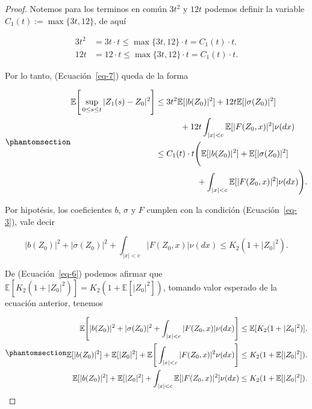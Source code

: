 \documentclass[
  spanish,
  us-letterpaper,
]{scrreprt}
\theoremstyle{plain}
\theoremstyle{plain}
\theoremstyle{definition}
\theoremstyle{plain}
\theoremstyle{remark}
\begin{document}
\begin{proof}
Notemos para los terminos en común \(3t^2\) y \(12t\) podemos definir la
variable \(C_1(t):=\max{\{3t,12\}}\), de aquí

\[
    \begin{aligned}
        3t^2 & = 3t\cdot t \leq \max{\{3t,12\}}\cdot t = C_1(t)\cdot t.\\ 
        12t & = 12\cdot t \leq \max{\{3t,12\}}\cdot t = C_1(t)\cdot t.
    \end{aligned}
\]

Por lo tanto, (Ecuación~\ref{eq-7}) queda de la forma

\begin{equation}\phantomsection\label{eq-8}{
    \begin{aligned}
        \mathbb{E}\Bigg[\sup\limits_{0\leq s\leq t}|Z_1(s)-Z_0|^2\Bigg] 
        & \leq 3t^2\mathbb{E}[|b(Z_0)|^2]+12t\mathbb{E}[|\sigma(Z_0)|^2]\\ 
        & \qquad\quad +12t\int_{|x|<c}\mathbb{E}[|F(Z_0,x)|^2]\nu(dx)\\ 
        & \leq C_1(t)\cdot t\Bigg(\mathbb{E}[|b(Z_0)|^2]+\mathbb{E}[|\sigma(Z_0)|^2]\\ 
        & \qquad \qquad\quad+\int_{|x|<c}\mathbb{E}[|F(Z_0,x)|^2]\nu(dx)\Bigg).
    \end{aligned}
}\end{equation}

Por hipotésis, los coeficientes \(b\), \(\sigma\) y \(F\) cumplen con la
condición (Ecuación~\ref{eq-3}), vale decir

\[
    |b(Z_0)|^2+|\sigma(Z_0)|^2+\int_{|x|<c}|F(Z_0,x)|\nu(dx)\leq K_2(1+|Z_0|^2).
\]

De (Ecuación~\ref{eq-6}) podemos afirmar que
\(\mathbb{E}[K_2(1+|Z_0|^2)]=K_2(1+\mathbb{E}[|Z_0|^2])\), tomando valor
esperado de la ecuación anterior, tenemos

\begin{equation}\phantomsection\label{eq-9}{
    \begin{aligned}
        \mathbb{E}\Bigg[|b(Z_0)|^2+|\sigma(Z_0)|^2+\int_{|x|<c}|F(Z_0,x)|\nu(dx)\Bigg] & \leq \mathbb{E}[K_2(1+|Z_0|^2)].\\
        \mathbb{E}[|b(Z_0)|^2]+\mathbb{E}[|Z_0|^2]+\mathbb{E}\Bigg[\int_{|x|<c}|F(Z_0,x)|^2\nu(dx)\Bigg] & \leq K_2(1+\mathbb{E}[|Z_0|^2]).\\ 
        \mathbb{E}[|b(Z_0)|^2]+\mathbb{E}[|Z_0|^2]+\int_{|x|<c}\mathbb{E}[|F(Z_0,x)|^2]\nu(dx)& \leq K_2(1+\mathbb{E}[|Z_0|^2]).    
    \end{aligned}
}\end{equation}


\end{proof}
\end{document}
